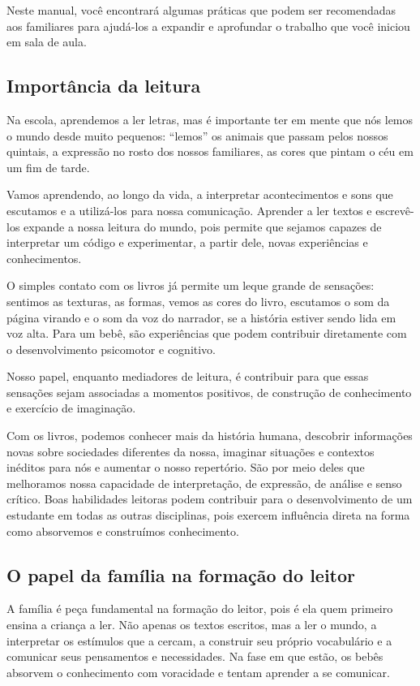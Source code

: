 \documentclass[11pt]{extarticle}
\begin{document}
Neste manual, você encontrará algumas práticas que podem ser 
recomendadas aos familiares para ajudá-los a expandir e aprofundar o trabalho 
que você iniciou em sala de aula.


\subsection{Importância da leitura}
Na escola, aprendemos a ler letras, mas é importante ter em mente que nós 
lemos o mundo desde muito pequenos: “lemos” os animais que passam pelos nossos 
quintais, a expressão no rosto dos nossos familiares, as cores que pintam o céu 
em um fim de tarde. 

Vamos aprendendo, ao longo da vida, a interpretar acontecimentos 
e sons que escutamos e a utilizá-los para nossa comunicação. Aprender a ler textos e 
escrevê-los expande a nossa leitura do mundo, pois permite que sejamos capazes de 
interpretar um código e experimentar, a partir dele, novas experiências e conhecimentos. 

O simples contato com os livros já permite um leque grande de sensações: 
sentimos as texturas, as formas, vemos as cores do livro, escutamos o som da página 
virando e o som da voz do narrador, se a história estiver sendo lida em voz alta. Para um 
bebê, são experiências que podem contribuir diretamente com o desenvolvimento psicomotor 
e cognitivo. 

Nosso papel, enquanto mediadores de leitura, é contribuir para que essas 
sensações sejam associadas a momentos positivos, de construção de 
conhecimento e exercício de imaginação. 

Com os livros, podemos conhecer mais da história humana, descobrir informações 
novas sobre sociedades diferentes da nossa, imaginar situações e contextos inéditos 
para nós e aumentar o nosso repertório. São por meio deles que melhoramos nossa 
capacidade de interpretação, de expressão, de análise e senso crítico. Boas habilidades 
leitoras podem contribuir para o desenvolvimento de um estudante em todas as outras 
disciplinas, pois exercem influência direta na forma como absorvemos e 
construímos conhecimento.


\subsection{O papel da família na formação do leitor}
A família é peça fundamental na formação do leitor, pois é ela quem primeiro 
ensina a criança a ler. Não apenas os textos escritos, mas a ler o mundo, a 
interpretar os estímulos que a cercam, a construir seu próprio vocabulário e a 
comunicar seus pensamentos e necessidades. Na fase em que estão, os bebês 
absorvem o conhecimento com voracidade e tentam aprender a se comunicar. 
\end{document}
